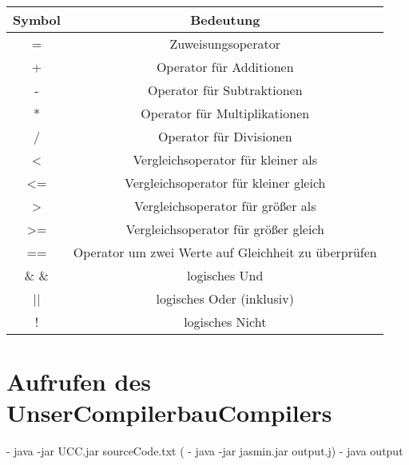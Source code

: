 \begin{center}
  \begin{tabular}{ | c | c | }
    \hline
    Symbol & Bedeutung\\ \hline \hline
    = & Zuweisungsoperator\\ \hline
    + & Operator für Additionen\\ \hline
    - & Operator für Subtraktionen\\ \hline
    * & Operator für Multiplikationen\\ \hline
    / & Operator für Divisionen\\ \hline
    
    < & Vergleichsoperator für kleiner als\\ \hline
    <= & Vergleichsoperator für kleiner gleich\\ \hline
    > & Vergleichsoperator für größer als\\ \hline
    >= & Vergleichsoperator für größer gleich\\ \hline    
    == & Operator um zwei Werte auf Gleichheit zu überprüfen\\ \hline    
    
    \& \&  & logisches Und \\ \hline    
    || & logisches Oder (inklusiv) \\ \hline    
    ! & logisches Nicht \\ \hline    
    
  \end{tabular}
\end{center}
	
\section{Aufrufen des UnserCompilerbauCompilers}
	- java -jar UCC.jar sourceCode.txt
  (	- java -jar jasmin.jar output.j)
  	- java output
